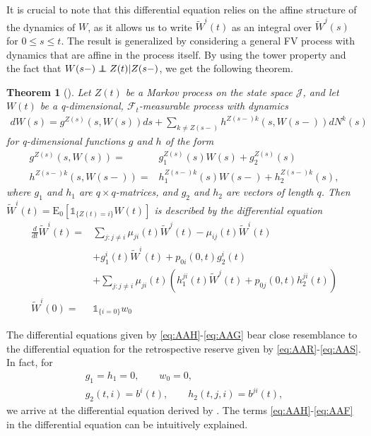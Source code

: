 \documentclass[12pt]{article}
\newcommand{\E}{\text{E}}
\newcommand{\indic}[1]{\mathds{1}_{ \{ #1 \} }}
\newcommand\independent{\protect\mathpalette{\protect\independenT}{\perp}}
\def\independenT#1#2{\mathrel{\rlap{$#1#2$}\mkern2mu{#1#2}}}
\theoremstyle{my_thm}
\newtheorem{thm}{Theorem}[section]
\begin{document}
It is crucial to note that this differential equation relies on the affine structure of the dynamics of $W$, as it allows us to write $\tilde{W}^i(t)$ as an integral over $\tilde{W}^j(s)$ for $0\leq s \leq t$. The result is generalized by considering a general FV process with dynamics that are affine in the process itself. By using the tower property and the fact that $W(s-)\independent Z(t)|Z(s-)$, we get the following theorem.
\begin{thm}[]
\label{thm:Diff_1}
Let $Z(t)$ be a Markov process on the state space $\mathcal{J}$, and let $W(t)$ be a q-dimensional, $\mathcal{F}_t$-measurable process with dynamics
\begin{align*}
dW(s)=  g^{Z(s)}(s,W(s))ds+
 \sum_{k \neq Z(s-)} h^{Z(s-)k}(s,W(s-)) dN^k(s) 
\end{align*}
for q-dimensional functions $g$ and $h$ of the form
\begin{align*}
g^{Z(s)}(s,W(s))=&g^{Z(s)}_1(s) W(s)+g_2^{Z(s)}(s)
\\
h^{Z(s-)k}(s,W(s-))=&h_1^{Z(s-)k}(s) W(s-)+h_2^{Z(s-)k}(s),
\end{align*}
where $g_1$ and $h_1$ are $q\times q$-matrices, and $g_2$ and $h_2$ are vectors of length $q$. Then $\tilde{W}^i(t)=\E_0[\indic{Z(t)=i}W(t)]$ is described by the differential equation
\begin{align}
\frac{d}{dt}\tilde{W}^i(t)=&
\sum_{j:j \neq i} \mu_{ji}(t) \tilde{W}^j(t)-\mu_{ij}(t)\tilde{W}^i(t)
 \label{eq:AAH} \\
&+
 g_1^i(t)\tilde{W}^i(t)+p_{0i}(0,t)g_2^i(t)
 \label{eq:AAI}\\
&+
\sum_{j:j\neq i} \mu_{ji}(t) \left(  h_1^{ji}(t) \tilde{W}^j(t) + p_{0j}(0,t)h_2^{ji}(t)\right) \label{eq:AAF}
\\
\tilde{W}^i(0)=&\indic{i=0}w_0 \label{eq:AAG}
\end{align}
\end{thm}
The differential equations given by \eqref{eq:AAH}-\eqref{eq:AAG} bear close resemblance to the differential equation for the retrospective reserve given by \eqref{eq:AAR}-\eqref{eq:AAS}. In fact, for
\begin{gather*}
g_1=h_1=0, \qquad w_0=0,
\\
g_2(t,i)=b^{i}(t),\qquad h_2(t,j,i)=b^{ji}(t),
\end{gather*}
we arrive at the differential equation derived by \citet{Norberg}. The terms \eqref{eq:AAH}-\eqref{eq:AAF} in the differential equation can be intuitively explained.
\\[12pt]
\end{document}
